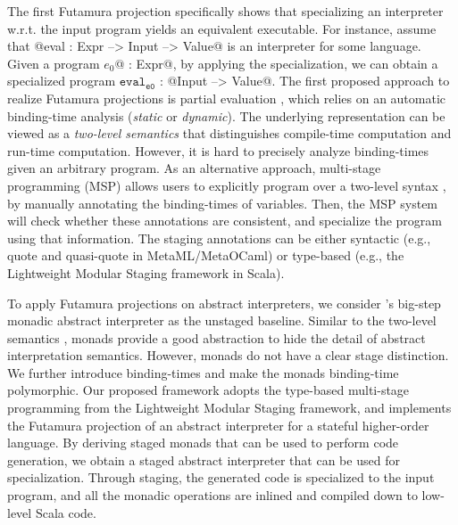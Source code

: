 The first Futamura projection specifically shows that specializing an
interpreter w.r.t. the input program yields an equivalent executable. For
instance, assume that @eval : Expr --> Input --> Value@ is an interpreter for some language.
Given a program $e_0$@ : Expr@, by applying the specialization, we can
obtain a specialized program $\texttt{eval}_{\texttt{e0}}$ : @Input --> Value@.
The first proposed approach to realize Futamura projections is partial
evaluation \cite{DBLP:books/daglib/0072559}, which relies on an automatic
binding-time analysis (\textit{static} or \textit{dynamic}).  The underlying
representation can be viewed as a \textit{two-level semantics}
\cite{NIELSON1989117, NIELSON198859} that distinguishes compile-time
computation and run-time computation.
However, it is hard to precisely analyze binding-times given an arbitrary
program. As an alternative approach, multi-stage programming (MSP)
\cite{taha1999multi, DBLP:conf/pepm/TahaS97} allows users to explicitly program over
a two-level syntax \cite{Nielson:1992:TFL:130665}, by manually
annotating the binding-times of variables. Then, the MSP system
will check whether these annotations are consistent, and specialize the program
using that information. The staging annotations can be either syntactic (e.g.,
quote and quasi-quote in MetaML/MetaOCaml) or type-based (e.g., the Lightweight
Modular Staging framework \cite{DBLP:conf/gpce/RompfO10} in Scala).

To apply Futamura projections on abstract interpreters, we consider
\citet{DBLP:journals/pacmpl/DaraisLNH17}'s big-step monadic abstract
interpreter as the unstaged baseline.  Similar to the two-level semantics
\cite{NIELSON1989117}, monads provide a good abstraction to hide the detail of
abstract interpretation semantics. However, monads do not have a clear
stage distinction.
We further introduce binding-times and make the monads binding-time polymorphic.
Our proposed framework adopts the type-based multi-stage programming from the
Lightweight Modular Staging framework, and implements the Futamura projection
of an abstract interpreter for a stateful higher-order
language. By deriving staged monads that can be used to perform code generation, we
obtain a staged abstract interpreter that can be used for specialization. Through
staging, the generated code is specialized to the input program, and all the
monadic operations are inlined and compiled down to low-level Scala code.

